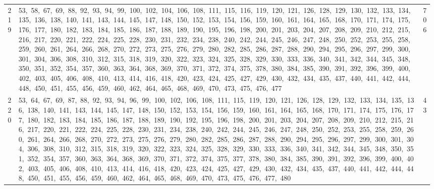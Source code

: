 \begin{longtable}{c|p{}|r}
219 & 53,\ 58,\ 67,\ 69,\ 88,\ 92,\ 93,\ 94,\ 99,\ 100,\ 102,\ 104,\ 106,\ 108,\ 111,\ 115,\ 116,\ 119,\ 120,\ 121,\ 126,\ 128,\ 129,\ 130,\ 132,\ 133,\ 134,\ 135,\ 136,\ 138,\ 140,\ 141,\ 143,\ 144,\ 145,\ 147,\ 148,\ 150,\ 152,\ 153,\ 154,\ 156,\ 159,\ 160,\ 161,\ 164,\ 165,\ 168,\ 170,\ 171,\ 174,\ 175,\ 176,\ 177,\ 180,\ 182,\ 183,\ 184,\ 185,\ 186,\ 187,\ 188,\ 189,\ 190,\ 195,\ 196,\ 198,\ 200,\ 201,\ 203,\ 204,\ 207,\ 208,\ 209,\ 210,\ 212,\ 215,\ 216,\ 217,\ 220,\ 221,\ 222,\ 224,\ 225,\ 228,\ 230,\ 231,\ 232,\ 234,\ 238,\ 240,\ 242,\ 244,\ 245,\ 246,\ 247,\ 248,\ 250,\ 252,\ 253,\ 255,\ 258,\ 259,\ 260,\ 261,\ 264,\ 266,\ 268,\ 270,\ 272,\ 273,\ 275,\ 276,\ 279,\ 280,\ 282,\ 285,\ 286,\ 287,\ 288,\ 290,\ 294,\ 295,\ 296,\ 297,\ 299,\ 300,\ 301,\ 304,\ 306,\ 308,\ 310,\ 312,\ 315,\ 318,\ 319,\ 320,\ 322,\ 323,\ 324,\ 325,\ 328,\ 329,\ 330,\ 333,\ 336,\ 340,\ 341,\ 342,\ 344,\ 345,\ 348,\ 350,\ 351,\ 352,\ 354,\ 357,\ 360,\ 363,\ 364,\ 368,\ 369,\ 370,\ 371,\ 372,\ 374,\ 375,\ 378,\ 380,\ 384,\ 385,\ 390,\ 391,\ 392,\ 396,\ 399,\ 400,\ 402,\ 403,\ 405,\ 406,\ 408,\ 410,\ 413,\ 414,\ 416,\ 418,\ 420,\ 423,\ 424,\ 425,\ 427,\ 429,\ 430,\ 432,\ 434,\ 435,\ 437,\ 440,\ 441,\ 442,\ 444,\ 448,\ 450,\ 451,\ 455,\ 456,\ 459,\ 460,\ 462,\ 464,\ 465,\ 468,\ 469,\ 470,\ 473,\ 475,\ 476,\ 477 & 706 \\
220 & 53,\ 64,\ 67,\ 69,\ 87,\ 88,\ 92,\ 93,\ 94,\ 96,\ 99,\ 100,\ 102,\ 106,\ 108,\ 111,\ 115,\ 119,\ 120,\ 121,\ 126,\ 128,\ 129,\ 132,\ 133,\ 134,\ 135,\ 136,\ 138,\ 140,\ 141,\ 143,\ 144,\ 145,\ 147,\ 148,\ 150,\ 152,\ 153,\ 154,\ 156,\ 159,\ 160,\ 161,\ 164,\ 165,\ 168,\ 170,\ 171,\ 174,\ 175,\ 176,\ 177,\ 180,\ 182,\ 183,\ 184,\ 185,\ 186,\ 187,\ 188,\ 189,\ 190,\ 192,\ 195,\ 196,\ 198,\ 200,\ 201,\ 203,\ 204,\ 207,\ 208,\ 209,\ 210,\ 212,\ 215,\ 216,\ 217,\ 220,\ 221,\ 222,\ 224,\ 225,\ 228,\ 230,\ 231,\ 234,\ 238,\ 240,\ 242,\ 244,\ 245,\ 246,\ 247,\ 248,\ 250,\ 252,\ 253,\ 255,\ 258,\ 259,\ 260,\ 261,\ 264,\ 266,\ 268,\ 270,\ 272,\ 273,\ 275,\ 276,\ 279,\ 280,\ 282,\ 285,\ 286,\ 287,\ 288,\ 290,\ 294,\ 295,\ 296,\ 297,\ 299,\ 300,\ 301,\ 304,\ 306,\ 308,\ 310,\ 312,\ 315,\ 318,\ 319,\ 320,\ 322,\ 323,\ 324,\ 325,\ 328,\ 329,\ 330,\ 333,\ 336,\ 340,\ 341,\ 342,\ 344,\ 345,\ 348,\ 350,\ 351,\ 352,\ 354,\ 357,\ 360,\ 363,\ 364,\ 368,\ 369,\ 370,\ 371,\ 372,\ 374,\ 375,\ 377,\ 378,\ 380,\ 384,\ 385,\ 390,\ 391,\ 392,\ 396,\ 399,\ 400,\ 402,\ 403,\ 405,\ 406,\ 408,\ 410,\ 413,\ 414,\ 416,\ 418,\ 420,\ 423,\ 424,\ 425,\ 427,\ 429,\ 430,\ 432,\ 434,\ 435,\ 437,\ 440,\ 441,\ 442,\ 444,\ 448,\ 450,\ 451,\ 455,\ 456,\ 459,\ 460,\ 462,\ 464,\ 465,\ 468,\ 469,\ 470,\ 473,\ 475,\ 476,\ 477,\ 480 & 43 \\

\end{longtable}

